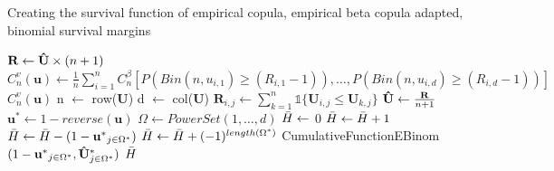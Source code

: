 \documentclass[12pt]{report}
\newcommand{\1}{\mathbf{1}}
\begin{document}
\begin{flushleft}
\begin{algorithm}[H]
\caption{Creating the survival function of empirical copula, empirical beta copula adapted, binomial survival margins}
\begin{algorithmic}
 
    \State $\textbf{R} \gets \mathbf{\Hat{U}} \times (n + 1)$
    \State $C^{v}_{n}(\textbf{u}) \gets \frac{1}{n}\sum\limits_{i = 1}^{n} C_{n}^{\beta} \left[P\left(Bin(n, u_{i,1}) \ge (R_{i,1} - 1)\right), \dots, P\left(Bin(n, u_{i,d}) \ge (R_{i,d} - 1)\right)\right]$
    \State \Return $C^{v}_{n}(\textbf{u})$
\EndProcedure
{}
    \State n $\gets$ row($\mathbf{U}$)
    \State d $\gets$ col($\mathbf{U}$)
            \State $\textbf{R}_{i,j} \gets \sum\limits_{k = 1}^{n} \mathds{1} \{ \textbf{U}_{i,j} \le \textbf{U}_{k,j} \}$
        \EndFor
    \EndFor
    \State $\mathbf{\Hat{U}} \gets \frac{\mathbf{R}}{n + 1}$ 
    \State $\mathbf{u^{*}} \gets 1 - reverse(\textbf{u})$ 
    \State $\Omega \gets PowerSet(1, \dots, d)$ 
    \State $\Bar{H} \gets$ 0 
            \State $\Bar{H} \gets \Bar{H} + 1$
            \State $\Bar{H} \gets \Bar{H} - (1 - \mathbf{u^{*}}_{j \in \Omega^{*}})$ 
        \Else
            \State $\Bar{H} \gets \Bar{H} + (-1)^{length(\Omega^{*})}$ CumulativeFunctionEBinom$(1 - \mathbf{u^{*}}_{j \in \Omega^{*}}, \mathbf{\Hat{U}^{*}}_{j \in \Omega^{*}}) $
        \EndIf
    \EndFor
    \State \Return $\Bar{H}$
\EndProcedure
\end{algorithmic}
\end{algorithm}


\end{flushleft}
\end{document}
